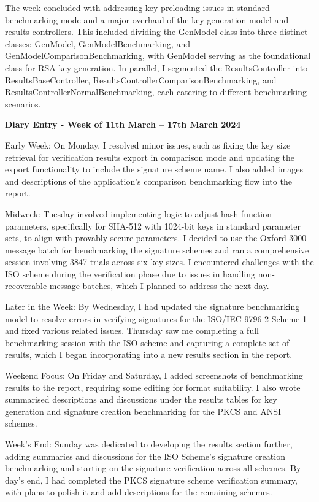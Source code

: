 \documentclass[]{final_report}
\theoremstyle{definition}
\begin{document}
The week concluded with addressing key preloading issues in standard benchmarking mode and a major
overhaul of the key generation model and results controllers. This included dividing the GenModel
class into three distinct classes: GenModel, GenModelBenchmarking, and
GenModelComparisonBenchmarking, with GenModel serving as the foundational class for RSA key
generation. In parallel, I segmented the ResultsController into ResultsBaseController,
ResultsControllerComparisonBenchmarking, and ResultsControllerNormalBenchmarking, each catering to
different benchmarking scenarios.

\textbf{Diary Entry - Week of 11th March – 17th March 2024}

Early Week:
On Monday, I resolved minor issues, such as fixing the key size retrieval for verification results export in comparison
mode and updating the export functionality to include the signature scheme name. I also added images and descriptions of
the application's comparison benchmarking flow into the report.

Midweek:
Tuesday involved implementing logic to adjust hash function parameters, specifically for SHA-512 with 1024-bit keys in
standard parameter sets, to align with provably secure parameters. I decided to use the Oxford 3000 message batch for
benchmarking the signature schemes and ran a comprehensive session involving 3847 trials across six key sizes. I
encountered challenges with the ISO scheme during the verification phase due to issues in handling non-recoverable
message batches, which I planned to address the next day.

Later in the Week:
By Wednesday, I had updated the signature benchmarking model to resolve errors in verifying signatures for the ISO/IEC
9796-2 Scheme 1 and fixed various related issues. Thursday saw me completing a full benchmarking session with the ISO
scheme and capturing a complete set of results, which I began incorporating into a new results section in the report.

Weekend Focus:
On Friday and Saturday, I added screenshots of benchmarking results to the report, requiring some editing for format
suitability. I also wrote summarised descriptions and discussions under the results tables for key generation and
signature creation benchmarking for the PKCS and ANSI schemes.

Week’s End:
Sunday was dedicated to developing the results section further, adding summaries and discussions for the ISO Scheme's
signature creation benchmarking and starting on the signature verification across all schemes. By day’s end, I had
completed the PKCS signature scheme verification summary, with plans to polish it and add descriptions for the remaining
schemes.
\end{document}
